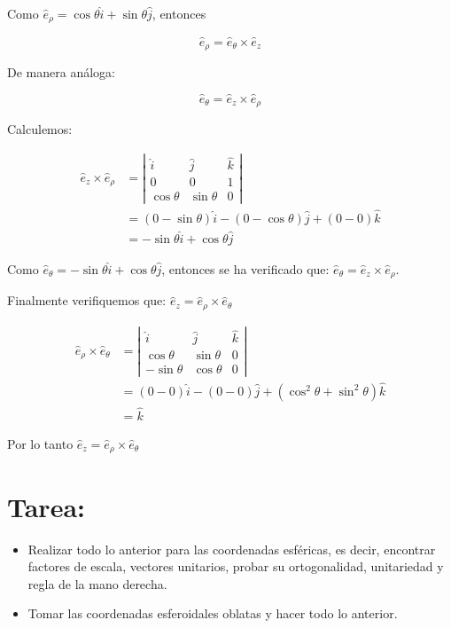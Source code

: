 Como $\hat{e}_{\rho}=\cos \theta \hat{i}+\sin \theta \hat{j}$, entonces

$$
\hat{e}_{\rho}=\hat{e}_{\theta} \times \hat{e}_{z}
$$

De manera análoga:

$$
\hat{e}_{\theta}=\widehat{e}_{z} \times \widehat{e}_{\rho}
$$

Calculemos:

$$
\begin{aligned}
\hat{e}_{z} \times \hat{e}_{\rho} & =\left|\begin{array}{ccc}
\hat{i} & \hat{j} & \hat{k} \\
0 & 0 & 1 \\
\cos \theta & \sin \theta & 0
\end{array}\right| \\
& =(0-\sin \theta) \hat{i}-(0-\cos \theta) \hat{j}+(0-0) \hat{k} \\
& =-\sin \theta \hat{i}+\cos \theta \hat{j}
\end{aligned}
$$

Como $\hat{e}_{\theta}=-\sin \theta \hat{i}+\cos \theta \hat{j}$, entonces se ha verificado que: $\hat{e}_{\theta}=\hat{e}_{z} \times \hat{e}_{\rho}$.

Finalmente verifiquemos que: $\widehat{e}_{z}=\widehat{e}_{\rho} \times \widehat{e}_{\theta}$

$$
\begin{aligned}
\widehat{e}_{\rho} \times \widehat{e}_{\theta} & =\left|\begin{array}{ccc}
\hat{i} & \hat{j} & \hat{k} \\
\cos \theta & \sin \theta & 0 \\
-\sin \theta & \cos \theta & 0
\end{array}\right| \\
& =(0-0) \hat{i}-(0-0) \hat{j}+\left(\cos ^{2} \theta+\sin ^{2} \theta\right) \hat{k} \\
& =\widehat{k}
\end{aligned}
$$

Por lo tanto $\hat{e}_{z}=\hat{e}_{\rho} \times \hat{e}_{\theta}$

\section{Tarea:}
\begin{itemize}
  \item Realizar todo lo anterior para las coordenadas esféricas, es decir, encontrar factores de escala, vectores unitarios, probar su ortogonalidad, unitariedad y regla de la mano derecha.

  \item Tomar las coordenadas esferoidales oblatas y hacer todo lo anterior.

\end{itemize}
